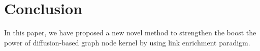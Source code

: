 \documentclass{article}
\begin{document}
\section{Conclusion}
\label{conclusion}
In this paper, we have proposed a new novel method to strengthen the boost the power of diffusion-based graph node kernel by using link enrichment paradigm.




\end{document}
